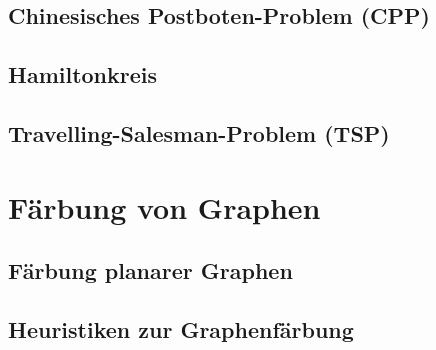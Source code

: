 \documentclass[10pt,a4paper,landscape]{article}
\begin{document}
\begin{multicols*}{2}
            \subsection{ Chinesisches Postboten-Problem (CPP) }

            \subsection{ Hamiltonkreis }

            \subsection{ Travelling-Salesman-Problem (TSP) }


        \section{ Färbung von Graphen }
            \subsection{ Färbung planarer Graphen }

            \subsection{ Heuristiken zur Graphenfärbung }


    \end{multicols*}
\end{document}
